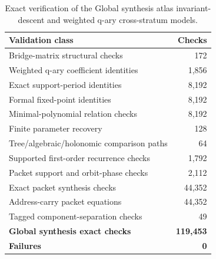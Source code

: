 \begin{table}[htbp]
\centering
\caption{Exact verification of the Global synthesis atlas invariant-descent and weighted q-ary cross-stratum models.}
\label{tab:block13-global-invariant-validation}
\small
\begin{tabularx}{\textwidth}{@{}Y r@{}}
\toprule
Validation class & Checks\\
\midrule
Bridge-matrix structural checks & 172\\
Weighted q-ary coefficient identities & 1,856\\
Exact support-period identities & 8,192\\
Formal fixed-point identities & 8,192\\
Minimal-polynomial relation checks & 8,192\\
Finite parameter recovery & 128\\
Tree/algebraic/holonomic comparison paths & 64\\
Supported first-order recurrence checks & 1,792\\
Packet support and orbit-phase checks & 2,112\\
Exact packet synthesis checks & 44,352\\
Address-carry packet equations & 44,352\\
Tagged component-separation checks & 49\\
\midrule
\textbf{Global synthesis exact checks} & \textbf{119,453}\\
\textbf{Failures} & \textbf{0}\\
\bottomrule
\end{tabularx}
\end{table}
